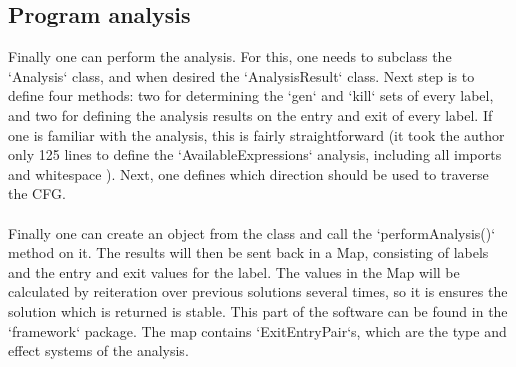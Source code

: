 \documentclass[paper=a4, fontsize=11pt]{scrartcl} %
\numberwithin{equation}{section} %
\numberwithin{figure}{section} %
\numberwithin{table}{section} %
\begin{document}
\subsection{Program analysis}

Finally one can perform the analysis.
For this, one needs to subclass the `Analysis` class, and when desired the `AnalysisResult` class.
Next step is to define four methods: two for determining the `gen` and `kill` sets of every label, and two for defining the analysis results on the entry and exit of every label.
If one is familiar with the analysis, this is fairly straightforward (it took the author only 125 lines to define the `AvailableExpressions` analysis, including all imports and whitespace \cite{ar}).
Next, one defines which direction should be used to traverse the CFG.
\\
\\
Finally one can create an object from the class and call the `performAnalysis()` method on it.
The results will then be sent back in a Map, consisting of labels and the entry and exit values for the label.
The values in the Map will be calculated by reiteration over previous solutions several times, so it is ensures the solution which is returned is stable.
This part of the software can be found in the `framework` package. The map contains `ExitEntryPair`s, which are the type and effect systems of the analysis.




\end{document}
